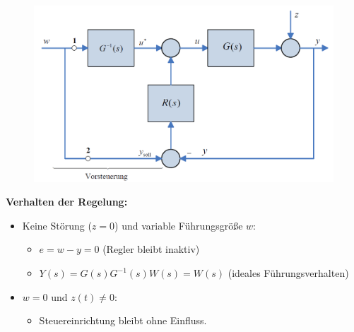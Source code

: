 \documentclass[10pt,a4paper]{article}
\begin{document}
\begin{figure}[H]
	\includegraphics[width=0.5\columnwidth]{imgs/abb7_2.png}
\end{figure}

\textbf{Verhalten der Regelung:}
\begin{itemize}
	\item Keine Störung ($z = 0$) und variable Führungsgröße $w$:
	\begin{itemize}
		\item $e = w - y = 0$ (Regler bleibt inaktiv)
		\item $Y(s) = G(s)G^{-1}(s)W(s) = W(s)$ (ideales Führungsverhalten)
	\end{itemize}
	\item $w = 0$ und $z(t) ≠ 0$:
	\begin{itemize}
		\item Steuereinrichtung bleibt ohne Einfluss.
	\end{itemize}
\end{itemize}
\end{document}
